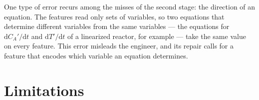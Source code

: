 One type of error recurs among the misses of the second stage: the direction of an equation. The
features read only sets of variables, so two equations that determine different variables from the
same variables --- the equations for $\mathrm{d}C_A'/\mathrm{d}t$ and $\mathrm{d}T'/\mathrm{d}t$ of
a linearized reactor, for example --- take the same value on every feature. This error misleads the
engineer, and its repair calls for a feature that encodes which variable an equation determines.

\section{Limitations}
\label{sec:limitations}

